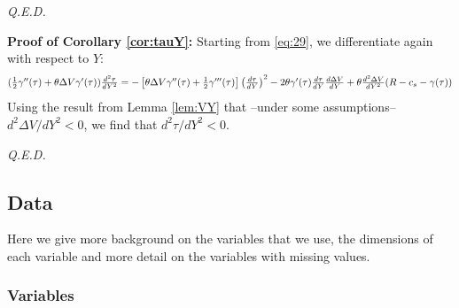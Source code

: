 \documentclass[12pt,english,a4paper]{article}
\newcommand{\qed}{\hspace*{\fill} {\em Q.E.D.}}
\begin{document}
 \qed

\textbf{Proof of Corollary \ref{cor:tauY}:}
Starting from \eqref{eq:29}, we differentiate again with respect to \(Y\):
\begin{equation}
\label{eq:38}
(\textstyle{1\over 2} \gamma''(\tau) + \theta \Delta V \gamma'(\tau)) \frac{d^2\tau}{dY^2} = - \left[\theta \Delta V \gamma''(\tau) + \textstyle{1\over 2} \gamma'''(\tau) \right] \left(\frac{d\tau}{dY} \right)^2 - 2\theta \gamma'(\tau) \frac{d\tau}{dY} \frac{d \Delta V}{dY} + \theta \frac{d^2 \Delta V}{dY^2} (R-c_s-\gamma(\tau)) 
\end{equation}
Using the result from Lemma \ref{lem:VY} that --under some assumptions-- \(d^2\Delta V/dY^2 <0\), we find that \(d^2\tau/dY^2 < 0\). 

 \qed


\subsection{Data}
\label{sec:org5ef0c84}

Here we give more background on the variables that we use, the dimensions of each variable and more detail on the variables with missing values.

\subsubsection{Variables}
\label{sec:orgd08bfac}
\end{document}

